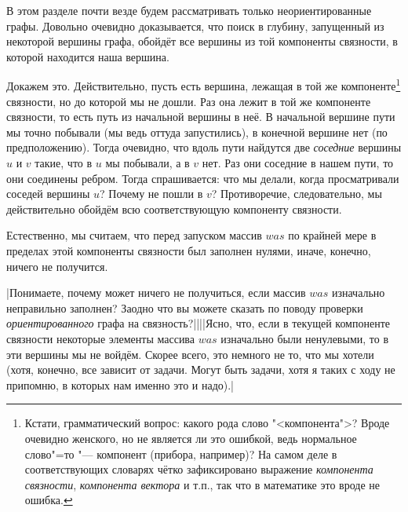 
В этом разделе почти везде будем рассматривать только неориентированные графы.
Довольно очевидно доказывается, что поиск в глубину, запущенный из некоторой вершины графа, обойдёт все вершины
из той компоненты связности, в которой находится наша вершина.

Докажем это. Действительно, пусть есть вершина, лежащая в той же 
компоненте\footnote{Кстати, грамматический вопрос: какого рода слово "<компонента">? Вроде очевидно 
женского, но не является ли это ошибкой, ведь нормальное слово"=то "--- компонент (прибора, например)? На самом деле в 
соответствующих словарях чётко зафиксировано выражение \textit{компонента связности}, 
\textit{компонента вектора} и т.п., так что в математике это вроде не ошибка.}
связности, но до которой мы не дошли.
Раз она лежит в той же компоненте связности, то есть путь из начальной вершины в неё. В начальной вершине пути мы точно побывали (мы ведь оттуда запустились), в конечной вершине нет (по предположению). Тогда очевидно, что вдоль пути найдутся
две \textit{соседние} вершины $u$ и $v$ такие, что в $u$ мы побывали, а в $v$ нет. Раз они соседние в нашем пути, то они
соединены ребром. Тогда спрашивается: что мы делали, когда просматривали соседей вершины $u$? Почему не пошли в $v$? 
Противоречие, следовательно, мы действительно обойдём всю соответствующую компоненту связности.


Естественно, мы считаем, что перед запуском массив $was$ по крайней мере в пределах этой компоненты связности был 
заполнен нулями, иначе, конечно, ничего не получится.

\task|Понимаете, почему может ничего не получиться, если массив $was$ изначально неправильно заполнен?
Заодно что вы можете сказать по поводу проверки \emph{ориентированного} графа на связность?||||Ясно, что, если в текущей компоненте связности некоторые элементы массива $was$ изначально были 
ненулевыми, то в эти вершины мы не войдём. Скорее всего, это немного не то, что мы хотели (хотя, конечно,
все зависит от задачи. Могут быть задачи, хотя я таких с ходу не припомню, в которых нам именно это и надо).|\label{fillwas}


